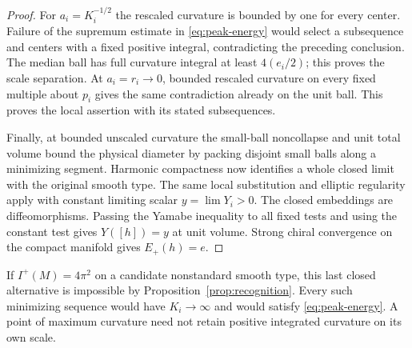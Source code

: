 \begin{proof}
For \(a_i=K_i^{-1/2}\) the rescaled curvature is bounded by one for
every center. Failure of the supremum estimate in
\eqref{eq:peak-energy} would select a subsequence and centers with
a fixed positive integral, contradicting the preceding conclusion.
The median ball has full curvature integral at least \(4(e_i/2)\);
this proves the scale separation. At \(a_i=r_i\to0\), bounded
rescaled curvature on every fixed multiple about \(p_i\) gives the
same contradiction already on the unit ball. This proves the
local assertion with its stated subsequences.

Finally, at bounded unscaled curvature the small-ball noncollapse
and unit total volume bound the physical diameter by packing
disjoint small balls along a minimizing segment. Harmonic compactness
now identifies a whole closed limit with the original smooth type.
The same local substitution and elliptic regularity apply with
constant limiting scalar \(y=\lim Y_i>0\). The closed embeddings
are diffeomorphisms. Passing the Yamabe inequality to all fixed tests
and using the constant test gives \(Y([h])=y\) at unit volume.
Strong chiral convergence on the compact manifold gives \(E_+(h)=e\).
\end{proof}

If \(I^+(M)=4\pi^2\) on a candidate nonstandard smooth type, this
last closed alternative is impossible by Proposition~\ref{prop:recognition}.
Every such minimizing sequence would have \(K_i\to\infty\) and
would satisfy \eqref{eq:peak-energy}. A point of maximum curvature
need not retain positive integrated curvature on its own scale.

